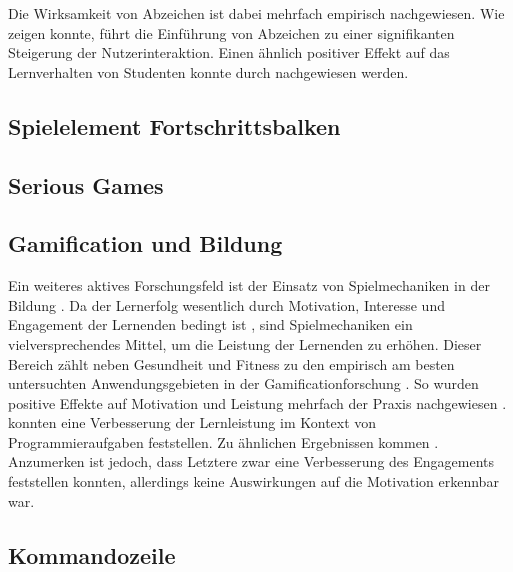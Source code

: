 Die Wirksamkeit von Abzeichen ist dabei mehrfach empirisch nachgewiesen. Wie \citeauthor{hamari_badges_2017} zeigen konnte, führt die Einführung von Abzeichen zu einer signifikanten Steigerung der Nutzerinteraktion. Einen ähnlich positiver Effekt auf das Lernverhalten von Studenten konnte durch \citeauthor{hamzah_influence_2015} nachgewiesen werden.


\subsection{Spielelement Fortschrittsbalken}
\subsection{Serious Games}

\subsection{Gamification und Bildung}
Ein weiteres aktives Forschungsfeld ist der Einsatz von Spielmechaniken in der Bildung \cite{ibanez_gamification_2014,landers_enhancing_2017}. Da der Lernerfolg wesentlich durch Motivation, Interesse und Engagement der Lernenden bedingt ist \cite{astin_student_1984}, sind Spielmechaniken ein vielversprechendes Mittel, um die Leistung der Lernenden zu erhöhen.
Dieser Bereich zählt neben Gesundheit und Fitness zu den empirisch am besten untersuchten Anwendungsgebieten in der Gamificationforschung \cite{koivisto_rise_2019}.
So wurden positive Effekte auf Motivation und Leistung mehrfach der Praxis nachgewiesen \cite{ibanez_gamification_2014,hamzah_influence_2015,strmecki_gamification_2015}. \cite{layth_khaleel_empirical_2019} konnten eine Verbesserung der Lernleistung im Kontext von Programmieraufgaben feststellen. Zu ähnlichen Ergebnissen kommen \cite{ortiz_gamification_2017}. Anzumerken ist jedoch, dass Letztere zwar eine Verbesserung des Engagements feststellen konnten, allerdings keine Auswirkungen auf die Motivation erkennbar war.

\subsection{Kommandozeile}